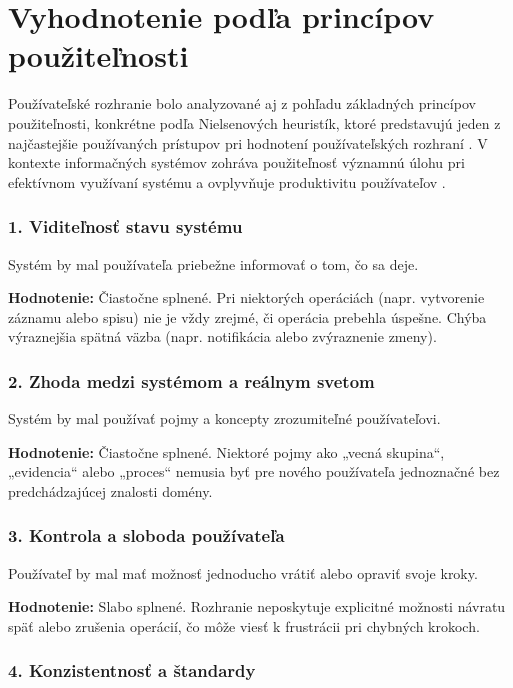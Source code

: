 \section{Vyhodnotenie podľa princípov použiteľnosti}

Používateľské rozhranie bolo analyzované aj z pohľadu základných princípov použiteľnosti, konkrétne podľa Nielsenových heuristík, ktoré predstavujú jeden z najčastejšie používaných prístupov pri hodnotení používateľských rozhraní \cite{nielsen}. 
V kontexte informačných systémov zohráva použiteľnosť významnú úlohu pri efektívnom využívaní systému a ovplyvňuje produktivitu používateľov \cite{laudon}.

\subsubsection*{1. Viditeľnosť stavu systému}

Systém by mal používateľa priebežne informovať o tom, čo sa deje.

\textbf{Hodnotenie:} Čiastočne splnené.  
Pri niektorých operáciách (napr. vytvorenie záznamu alebo spisu) nie je vždy zrejmé, či operácia prebehla úspešne. Chýba výraznejšia spätná väzba (napr. notifikácia alebo zvýraznenie zmeny).

\subsubsection*{2. Zhoda medzi systémom a reálnym svetom}

Systém by mal používať pojmy a koncepty zrozumiteľné používateľovi.

\textbf{Hodnotenie:} Čiastočne splnené.  
Niektoré pojmy ako „vecná skupina“, „evidencia“ alebo „proces“ nemusia byť pre nového používateľa jednoznačné bez predchádzajúcej znalosti domény.

\subsubsection*{3. Kontrola a sloboda používateľa}

Používateľ by mal mať možnosť jednoducho vrátiť alebo opraviť svoje kroky.

\textbf{Hodnotenie:} Slabo splnené.  
Rozhranie neposkytuje explicitné možnosti návratu späť alebo zrušenia operácií, čo môže viesť k frustrácii pri chybných krokoch.

\subsubsection*{4. Konzistentnosť a štandardy}

